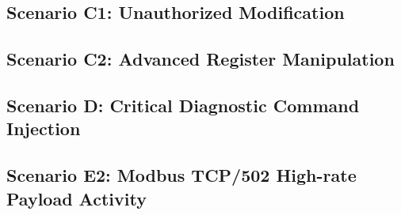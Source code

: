 \subsection{Scenario C1: Unauthorized Modification}


\subsection{Scenario C2: Advanced Register Manipulation}


\subsection{Scenario D: Critical Diagnostic Command Injection}


\subsection{Scenario E2: Modbus TCP/502 High-rate Payload Activity}
